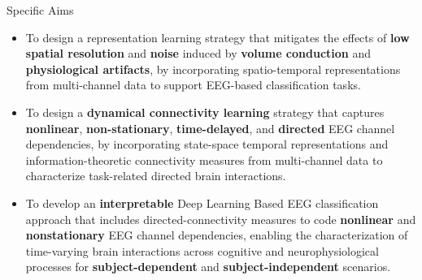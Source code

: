 \documentclass[aspectratio=169]{beamer}
\begin{document}
\begin{frame}{Specific Aims}
  \begin{itemize}
    \setlength\itemsep{0.4em}
    \justifying

    \item[1] To design a representation learning strategy that mitigates the effects of 
    \textbf{low spatial resolution} and \textbf{noise} induced by \textbf{volume conduction} 
    and \textbf{physiological artifacts}, by incorporating {spatio-temporal} 
    representations from {multi-channel} data to support 
    {EEG-based classification tasks}.
    
    \item[2] To design a \textbf{dynamical connectivity learning} strategy that captures 
    \textbf{nonlinear}, \textbf{non-stationary}, \textbf{time-delayed}, and 
    \textbf{directed} EEG channel dependencies, by incorporating 
    {state-space temporal representations} and {information-theoretic connectivity measures} from {multi-channel} data 
    to characterize {task-related directed brain interactions}.

    \item[3] To develop an \textbf{interpretable} Deep Learning Based EEG classification approach 
    that includes directed-connectivity measures to code \textbf{nonlinear} and 
    \textbf{nonstationary} {EEG channel dependencies}, enabling the characterization 
    of {time-varying brain interactions} across {cognitive and neurophysiological} processes for \textbf{subject-dependent} and \textbf{subject-independent} scenarios.

  \end{itemize}
\end{frame}



\end{document}
